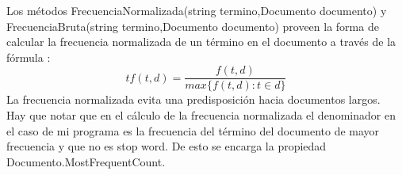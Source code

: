 \documentclass{article}
\begin{document}
Los métodos FrecuenciaNormalizada(string termino,Documento documento) y FrecuenciaBruta(string termino,Documento documento) proveen la forma de calcular la frecuencia normalizada de un término en el documento a través de la fórmula :\\
\begin{equation}
  tf(t,d)=\frac {f(t,d)} {max\{f(t,d):t \in d\}}
\end{equation}
La frecuencia normalizada evita una predisposición hacia documentos largos.\\
Hay que notar que en el cálculo de la frecuencia normalizada el denominador en el caso de mi programa es la frecuencia del término del documento de mayor frecuencia y que no es stop word. De esto se encarga la propiedad Documento.MostFrequentCount.\\
\end{document}
